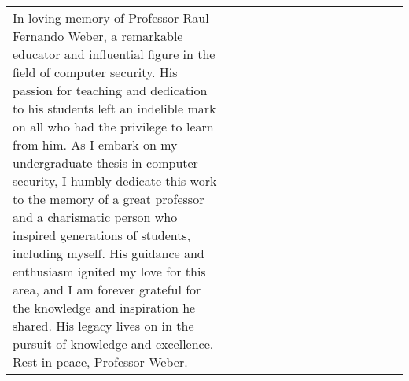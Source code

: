 \clearpage
\begin{flushright}
    \mbox{}\vfill
    \begin{tabular}{p{0.55\linewidth} p{0.45\linewidth}}
        In loving memory of Professor Raul Fernando Weber, a remarkable educator and influential figure in the field of computer security. His passion for teaching and dedication to his students left an indelible mark on all who had the privilege to learn from him. As I embark on my undergraduate thesis in computer security, I humbly dedicate this work to the memory of a great professor and a charismatic person who inspired generations of students, including myself. His guidance and enthusiasm ignited my love for this area, and I am forever grateful for the knowledge and inspiration he shared. His legacy lives on in the pursuit of knowledge and excellence. Rest in peace, \mbox{Professor} Weber.\\
    \end{tabular}
\end{flushright}